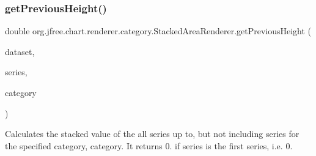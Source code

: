 \mbox{\label{classorg_1_1jfree_1_1chart_1_1renderer_1_1category_1_1_stacked_area_renderer_ad81ee52b117087d77bf6def419826f90}} 
\subsubsection{\texorpdfstring{get\+Previous\+Height()}{getPreviousHeight()}}
{\footnotesize\ttfamily double org.\+jfree.\+chart.\+renderer.\+category.\+Stacked\+Area\+Renderer.\+get\+Previous\+Height (\begin{DoxyParamCaption}\item[{\mbox{\hyperlink{interfaceorg_1_1jfree_1_1data_1_1category_1_1_category_dataset}{Category\+Dataset}}}]{dataset,  }\item[{int}]{series,  }\item[{int}]{category }\end{DoxyParamCaption})\hspace{0.3cm}{\ttfamily [protected]}}

Calculates the stacked value of the all series up to, but not including {\ttfamily series} for the specified category, {\ttfamily category}. It returns 0. if {\ttfamily series} is the first series, i.\+e. 0.



